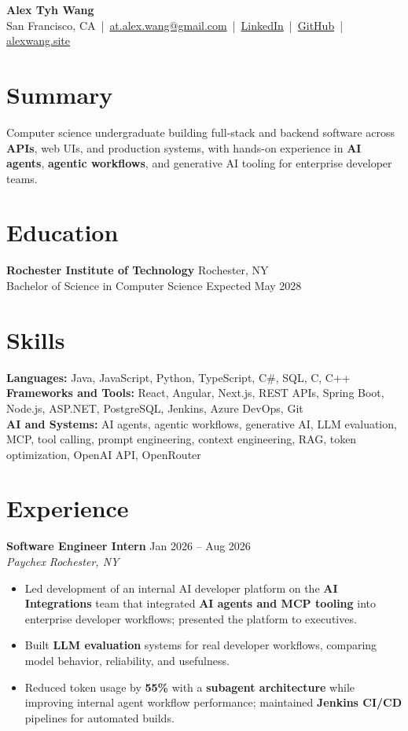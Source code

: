\documentclass[10pt,letterpaper]{article}
\newif\ifresumeFirstRole
\newcommand{\resumeRole}[4]{%
  \ifresumeFirstRole
    \global\resumeFirstRolefalse
  \else
    \vspace{0pt plus 1fill}%
  \fi
  \textbf{#1} \hfill #2\\
  \textit{#3} \hfill \textit{#4}
}
\begin{document}
\begin{center}
{\Large \textbf{Alex Tyh Wang}}\\
San Francisco, CA \,|\, \href{mailto:at.alex.wang@gmail.com}{at.alex.wang@gmail.com} \,|\, \href{https://www.linkedin.com/in/alex-tyh-wang/}{LinkedIn} \,|\, \href{https://github.com/alextyhwang}{GitHub} \,|\, \href{https://alexwang.site}{alexwang.site}
\end{center}

\section*{Summary}
Computer science undergraduate building full-stack and backend software across \textbf{APIs}, web UIs, and production systems, with hands-on experience in \textbf{AI agents}, \textbf{agentic workflows}, and generative AI tooling for enterprise developer teams.

\section*{Education}
\textbf{Rochester Institute of Technology} \hfill Rochester, NY\\
Bachelor of Science in Computer Science \hfill Expected May 2028

\section*{Skills}
\textbf{Languages:} Java, JavaScript, Python, TypeScript, C\#, SQL, C, C++\\
\textbf{Frameworks and Tools:} React, Angular, Next.js, REST APIs, Spring Boot, Node.js, ASP.NET, PostgreSQL, Jenkins, Azure DevOps, Git\\
\textbf{AI and Systems:} AI agents, agentic workflows, generative AI, LLM evaluation, MCP, tool calling, prompt engineering, context engineering, RAG, token optimization, OpenAI API, OpenRouter

\section*{Experience}
\resumeRole{Software Engineer Intern}{Jan 2026 -- Aug 2026}{Paychex}{Rochester, NY}
\begin{itemize}
  \item Led development of an internal AI developer platform on the \textbf{AI Integrations} team that integrated \textbf{AI agents and MCP tooling} into enterprise developer workflows; presented the platform to executives.
  \item Built \textbf{LLM evaluation} systems for real developer workflows, comparing model behavior, reliability, and usefulness.
  \item Reduced token usage by \textbf{55\%} with a \textbf{subagent architecture} while improving internal agent workflow performance; maintained \textbf{Jenkins CI/CD} pipelines for automated builds.
\end{itemize}
\end{document}
